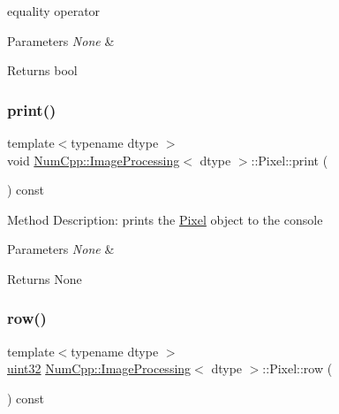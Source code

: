 equality operator


\begin{DoxyParams}{Parameters}
{\em None} & \\
\hline
\end{DoxyParams}
\begin{DoxyReturn}{Returns}
bool 
\end{DoxyReturn}
\mbox{\label{class_num_cpp_1_1_image_processing_1_1_pixel_a69ef2bd3697c1acd747ec6fb5bc646e1}} 
\subsubsection{\texorpdfstring{print()}{print()}}
{\footnotesize\ttfamily template$<$typename dtype $>$ \\
void \mbox{\hyperlink{class_num_cpp_1_1_image_processing}{Num\+Cpp\+::\+Image\+Processing}}$<$ dtype $>$\+::Pixel\+::print (\begin{DoxyParamCaption}{ }\end{DoxyParamCaption}) const\hspace{0.3cm}{\ttfamily [inline]}}

Method Description\+: prints the \mbox{\hyperlink{class_num_cpp_1_1_image_processing_1_1_pixel}{Pixel}} object to the console


\begin{DoxyParams}{Parameters}
{\em None} & \\
\hline
\end{DoxyParams}
\begin{DoxyReturn}{Returns}
None 
\end{DoxyReturn}
\mbox{\label{class_num_cpp_1_1_image_processing_1_1_pixel_af5240a6addc57c5951fb38879b18162d}} 
\subsubsection{\texorpdfstring{row()}{row()}}
{\footnotesize\ttfamily template$<$typename dtype $>$ \\
\mbox{\hyperlink{namespace_num_cpp_a36f388e948380413c63011cab9b7fbd5}{uint32}} \mbox{\hyperlink{class_num_cpp_1_1_image_processing}{Num\+Cpp\+::\+Image\+Processing}}$<$ dtype $>$\+::Pixel\+::row (\begin{DoxyParamCaption}{ }\end{DoxyParamCaption}) const\hspace{0.3cm}{\ttfamily [inline]}}


